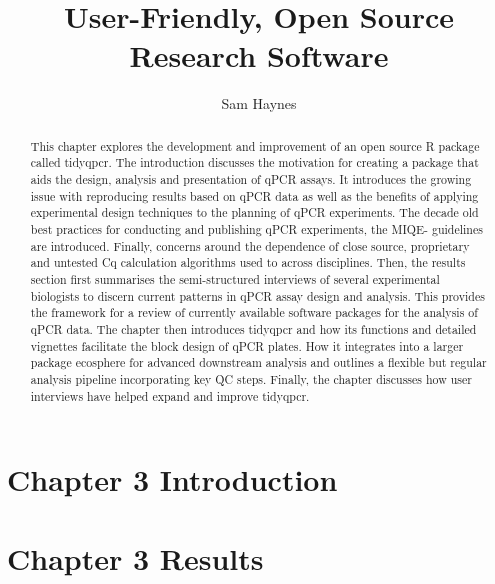 \documentclass{SBCbookchapter}
\author{Sam Haynes}
\title{User-Friendly, Open Source Research Software}
\begin{document}
\maketitle

\begin{abstract}
This chapter explores the development and improvement of an open source R package called tidyqpcr. The introduction discusses the motivation for creating a package that aids the design, analysis and presentation of qPCR assays. It introduces the growing issue with reproducing results based on qPCR data as well as the benefits of applying experimental design techniques to the planning of qPCR experiments. The decade old best practices for conducting and publishing qPCR experiments, the MIQE- guidelines are introduced. Finally, concerns around the dependence of close source, proprietary and untested Cq calculation algorithms used to across disciplines. Then, the results section first summarises the semi-structured interviews of several experimental biologists to discern current patterns in qPCR assay design and analysis. This provides the framework for a review of currently available software packages for the analysis of qPCR data. The chapter then introduces tidyqpcr and how its functions and detailed vignettes facilitate the block design of qPCR plates. How it integrates into a larger package ecosphere for advanced downstream analysis and outlines a flexible but regular analysis pipeline incorporating key QC steps. Finally, the chapter discusses how user interviews have helped expand and improve tidyqpcr.


\end{abstract}

\section{Chapter 3 Introduction}

\section{Chapter 3 Results}
\end{document}
